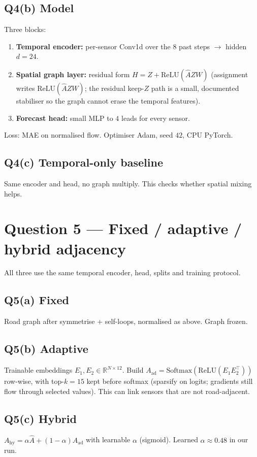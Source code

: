 \documentclass[11pt,a4paper]{article}
\begin{document}
\subsection*{Q4(b) Model}
Three blocks:
\begin{enumerate}
\item \textbf{Temporal encoder:} per-sensor Conv1d over the $8$ past steps $\to$ hidden $d=24$.
\item \textbf{Spatial graph layer:} residual form $H=Z+\mathrm{ReLU}(\hat A Z W)$ (assignment writes $\mathrm{ReLU}(\hat A Z W)$; the residual keep-$Z$ path is a small, documented stabiliser so the graph cannot erase the temporal features).
\item \textbf{Forecast head:} small MLP to $4$ leads for every sensor.
\end{enumerate}
Loss: MAE on normalised flow. Optimiser Adam, seed $42$, CPU PyTorch.

\subsection*{Q4(c) Temporal-only baseline}
Same encoder and head, no graph multiply. This checks whether spatial mixing helps.

\section*{Question 5 --- Fixed / adaptive / hybrid adjacency}

All three use the same temporal encoder, head, splits and training protocol.

\subsection*{Q5(a) Fixed}
Road graph after symmetrise + self-loops, normalised as above. Graph frozen.

\subsection*{Q5(b) Adaptive}
Trainable embeddings $E_1,E_2\in\mathbb{R}^{N\times 12}$. Build
$A_{\mathrm{ad}}=\mathrm{Softmax}(\mathrm{ReLU}(E_1 E_2^\top))$ row-wise, with top-$k=15$ kept before softmax (sparsify on logits; gradients still flow through selected values). This can link sensors that are not road-adjacent.

\subsection*{Q5(c) Hybrid}
$A_{\mathrm{hy}}=\alpha\hat A+(1-\alpha)A_{\mathrm{ad}}$ with learnable $\alpha$ (sigmoid). Learned $\alpha\approx 0.48$ in our run.
\end{document}
